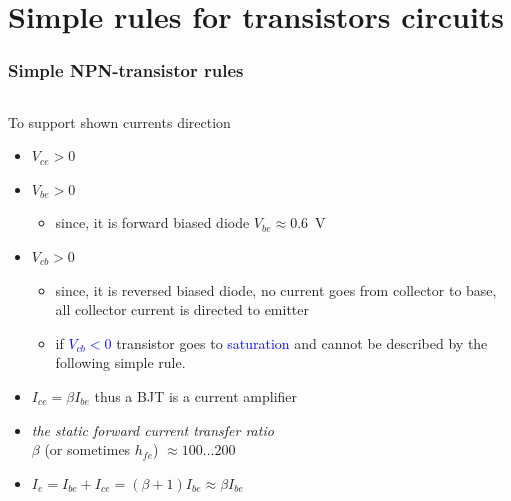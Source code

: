 \documentclass[beamer]{standalone}
\begin{document}
\section{Simple rules for transistors circuits} 
\begin{frame}
\frametitle{Simple NPN-transistor rules}
\begin{columns}[t]
 \begin{column}{.75\textwidth}
  To support shown currents direction
  \begin{itemize}
   \item<2-> \alert{$V_{ce} > 0$}
   \item<3-> \alert{$V_{be} > 0$}
    \begin{itemize}
     \item since, it is forward biased diode $V_{be} \approx 0.6$~V
    \end{itemize}
   \item<4-> \alert{$V_{cb} > 0$}
    \begin{itemize}
     \item since, it is reversed biased diode, no current goes from
      collector to base, all collector current is directed to emitter 
     \item if \textcolor{blue}{$V_{cb} < 0$} transistor goes to
      \textcolor{blue}{saturation} and cannot be
      described by the following simple rule.
    \end{itemize}
  \end{itemize}
  \begin{itemize}
   \item<6-> \alert{$I_{ce}=\beta I_{be}$} thus a BJT is a current
    amplifier
   \item<7-> {\it the static forward current transfer ratio}\\
    $\beta$ (or sometimes $h_{fe}$)   $\approx 100 \ldots 200$ 
   \item<8-> $I_e = I_{be} + I_{ce} = (\beta+1) I_{be} \approx \beta I_{be}$
  \end{itemize}


\end{column}
\end{columns}
\end{frame}
\end{document}
